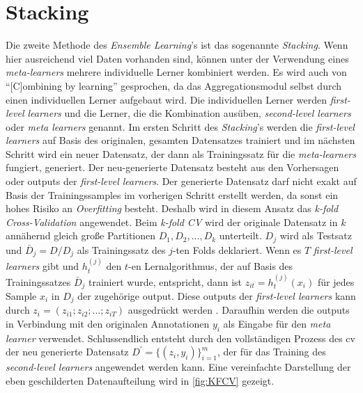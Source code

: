 \section{Stacking}
Die zweite Methode des \textit{Ensemble Learning}'s ist das sogenannte \textit{Stacking}. Wenn hier ausreichend viel Daten vorhanden sind, können unter der Verwendung eines \textit{meta-learners} mehrere individuelle Lerner kombiniert werden. Es wird auch von \enquote{[C]ombining by learning}\autocite[S.196]{Zhou.2021} gesprochen, da das Aggregationsmodul selbst durch einen individuellen Lerner aufgebaut wird. Die individuellen Lerner werden \textit{first-level learners} und die Lerner, die die Kombination ausüben, \textit{second-level learners} oder \textit{meta learners} genannt. Im ersten Schritt des \textit{Stacking}'s werden die \textit{first-level learners} auf Basis des originalen, gesamten Datensatzes trainiert und im nächsten Schritt wird ein neuer Datensatz, der dann als Trainingssatz für die \textit{meta-learners} fungiert, generiert. Der neu-generierte Datensatz besteht aus den Vorhersagen oder \glspl{output} der \textit{first-level learners}. Der generierte Datensatz darf nicht exakt auf Basis der Trainingssamples im vorherigen Schritt erstellt werden, da sonst ein hohes Risiko an \textit{Overfitting} besteht. Deshalb wird in diesem Ansatz das \textit{k-fold Cross-Validation} angewendet. Beim \textit{k-fold CV} wird der originale Datensatz in $k$ annähernd gleich große Partitionen $D_1, D_2,\dots, D_k$ unterteilt. $D_j$ wird als Testsatz und $\bar{D}_j = D/D_j$ als Trainingssatz des $j$-ten Folds deklariert. 
Wenn es  $T$ \textit{first-level learners} gibt und $h_{t}^{(j)}$ den $t$-en Lernalgorithmus, der auf Basis des Trainingssatzes $\bar{D}_j$ trainiert wurde, entspricht, dann ist $z_{it} = h_{t}^{(j)}(x_i)$ für jedes Sample $x_i$ in $D_j$ der zugehörige \gls{output}. Diese \glspl{output} der \textit{first-level learners} kann durch $z_i = (z_{i1}; z_{i2}; \dots; z_{iT})$ ausgedrückt werden \autocite[vgl. S.197,29]{Zhou.2021} \autocite[vgl. S84f.]{Zhou.2012}. 
Daraufhin werden die \glspl{output} in Verbindung mit den originalen Annotationen $y_i$ als Eingabe für den \textit{meta learner} verwendet. Schlussendlich entsteht durch den vollständigen Prozess des \gls{cv} der  neu generierte Datensatz $D^{'}=\{(z_i, y_i)\}_{i=1}^{m}$, der für das Training des \textit{second-level learners} angewendet werden kann. Eine vereinfachte Darstellung der eben geschilderten Datenaufteilung wird in \autoref{fig:KFCV} gezeigt.

